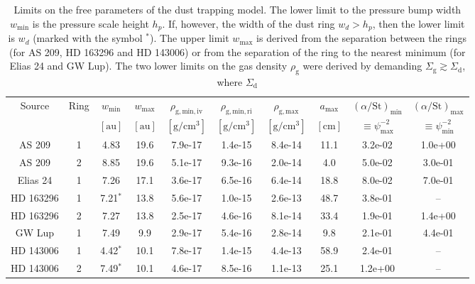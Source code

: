 \documentclass{aa}
\begin{document}
\begin{table*}
\begin{center}
\begin{tabular}{|cc|cccccc|cc|}
\hline
\hline
Source     & Ring & $w_{\mathrm{min}}$ & $w_{\mathrm{max}}$ & $\rho_{\mathrm{g,min,iv}}$ & $\rho_{\mathrm{g,min,ri}}$ & $\rho_{\mathrm{g,max}}$ & $a_{\mathrm{max}}$ & $(\alpha/\mathrm{St})_{\mathrm{min}}$ & $(\alpha/\mathrm{St})_{\mathrm{max}}$\\
           &      & $[\mathrm{au}]$  & $[\mathrm{au}]$  & $[\mathrm{g}/\mathrm{cm}^3]$ & $[\mathrm{g}/\mathrm{cm}^3]$ & $[\mathrm{g}/\mathrm{cm}^3]$ & $[\mathrm{cm}]$ & $\equiv\psi^{-2}_{\mathrm{max}}$ & $\equiv\psi^{-2}_{\mathrm{min}}$\\
\hline
AS 209     & 1 &  4.83 & 19.6 & 7.9e-17 & 1.4e-15 & 8.4e-14 & 11.1 & 3.2e-02 & 1.0e+00 \\
AS 209     & 2 &  8.85 & 19.6 & 5.1e-17 & 9.3e-16 & 2.0e-14 &  4.0 & 5.0e-02 & 3.0e-01 \\
Elias 24   & 1 &  7.26 & 17.1 & 3.6e-17 & 6.5e-16 & 6.4e-14 & 18.8 & 8.0e-02 & 7.0e-01 \\
HD 163296  & 1 &  7.21$^{*}$ & 13.8 & 5.6e-17 & 1.0e-15 & 2.6e-13 & 48.7 & 3.8e-01 & -- \\
HD 163296  & 2 &  7.27 & 13.8 & 2.5e-17 & 4.6e-16 & 8.1e-14 & 33.4 & 1.9e-01 & 1.4e+00 \\
GW Lup     & 1 &  7.49 &  9.9 & 2.9e-17 & 5.4e-16 & 2.8e-14 &  9.8 & 2.1e-01 & 4.4e-01 \\
HD 143006  & 1 &  4.42$^{*}$ & 10.1 & 7.8e-17 & 1.4e-15 & 4.4e-13 & 58.9 & 2.4e-01 & -- \\
HD 143006  & 2 &  7.49$^{*}$ & 10.1 & 4.6e-17 & 8.5e-16 & 1.1e-13 & 25.1 & 1.2e+00 & -- \\
\hline
\hline
\end{tabular}
\end{center}
\caption{\label{tab-ring-model-limits}Limits on the free parameters of the dust
  trapping model. The lower limit to the pressure bump width $w_{\mathrm{min}}$
  is the pressure scale height $h_p$. If, however, the width of the dust ring
  $w_d>h_p$, then the lower limit is $w_d$ (marked with the symbol $^{*}$).  The
  upper limit $w_{\mathrm{max}}$ is derived from the separation between the
  rings (for AS 209, HD 163296 and HD 143006) or from the separation of the ring
  to the nearest minimum (for Elias 24 and GW Lup). The two lower limits on the
  gas density $\rho_{\mathrm{g}}$ were derived by demanding
  $\Sigma_{\mathrm{g}}\gtrsim \Sigma_{\mathrm{d}}$, where $\Sigma_{\mathrm{d}}$
}
\end{table*}
\end{document}
